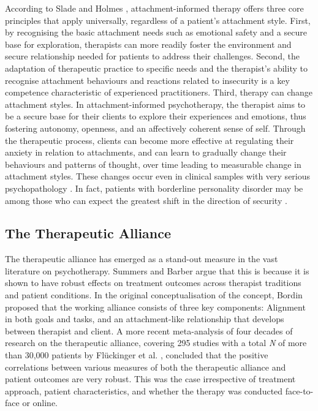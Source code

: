 \documentclass[12pt]{report}
\begin{document}
According to Slade and Holmes \citeyear{Slade2019}, attachment-informed therapy offers three core principles that apply universally, regardless of a patient's attachment style.
First, by recognising the basic attachment needs such as emotional safety and a secure base for exploration, therapists can more readily foster the environment and secure relationship needed for patients to address their challenges.
Second, the adaptation of therapeutic practice to specific needs and the therapist's ability to recognise attachment behaviours and reactions related to insecurity is a key competence characteristic of experienced practitioners.
Third, therapy can change attachment styles. In attachment-informed psychotherapy, the therapist aims to be a secure base for their clients to explore their experiences and emotions, thus fostering autonomy, openness, and an affectively coherent sense of self.
Through the therapeutic process, clients can become more effective at regulating their anxiety in relation to attachments, and can learn to gradually change their behaviours and patterns of thought, over time leading to measurable change in attachment styles.
These changes occur even in clinical samples with very serious psychopathology \cite{Fonagy1996}.
In fact, patients with borderline personality disorder may be among those who can expect the greatest shift in the direction of security \cite{Levy2006, Stovall2003}.

\subsection{The Therapeutic Alliance}
The therapeutic alliance has emerged as a stand-out measure in the vast literature on psychotherapy.
Summers and Barber \citeyear{Summers2003} argue that this is because it is shown to have robust effects on treatment outcomes across therapist traditions and patient conditions.
In the original conceptualisation of the concept, Bordin \citeyear{Bordin1979} proposed that the working alliance consists of three key components: Alignment in both goals and tasks, and an attachment-like relationship that develops between therapist and client.
A more recent meta-analysis of four decades of research on the therapeutic alliance, covering 295 studies with a total \textit{N} of more than 30,000 patients by Flückinger et al. \citeyear{Fluckinger2018}, concluded that the positive correlations between various measures of both the therapeutic alliance and patient outcomes are very robust.
This was the case irrespective of treatment approach, patient characteristics, and whether the therapy was conducted face-to-face or online.
\end{document}

